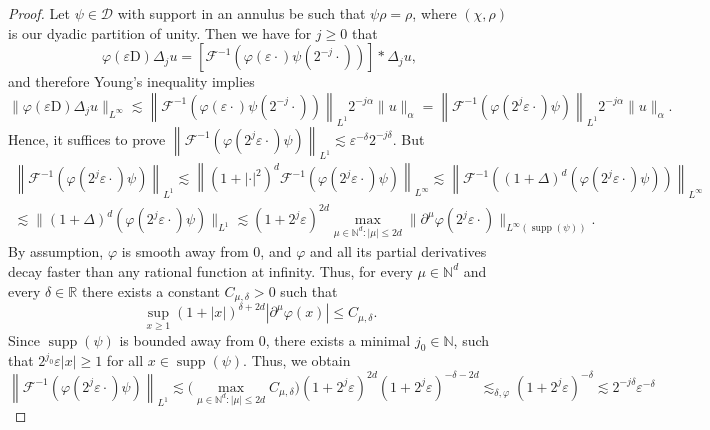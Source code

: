 \documentclass[11pt,a4paper]{article}
\newcommand{\cdummy}{\cdot}
\newcommand{\mathD}{\mathrm{D}}
\newcommand{\tmop}[1]{\ensuremath{\operatorname{#1}}}
\theoremstyle{remark}
\newcommand{\CD}{\ensuremath{\mathscr{D}}}
\newcommand{\CF}{\ensuremath{\mathscr{F}}}
\begin{document}
\begin{proof}
  Let $\psi \in \CD$ with support in an annulus be such that $\psi \rho = \rho$, where $( \chi , \rho )$ is our dyadic partition of unity. Then we have for $j \geqslant 0$ that
  \[
     \varphi ( \varepsilon \mathD ) \Delta_{j} u= \left[ \CF^{-1} ( \varphi (\varepsilon \cdummy ) \psi ( 2^{-j} \cdummy ) ) \right] \ast \Delta_{j}  u,
  \]
  and therefore Young's inequality implies
  \[
     \| \varphi ( \varepsilon \mathD ) \Delta_{j} u \|_{L^{\infty}} \lesssim \left\| \CF^{-1} ( \varphi ( \varepsilon \cdummy ) \psi ( 2^{-j} \cdummy ) ) \right\|_{L^{1}} 2^{-j \alpha} \| u \|_{\alpha} = \left\| \CF^{-1} ( \varphi ( 2^{j} \varepsilon \cdummy ) \psi ) \right\|_{L^{1}} 2^{-j \alpha} \| u \|_{\alpha}.
  \]
  Hence, it suffices to prove $\left\| \CF^{-1} ( \varphi ( 2^{j} \varepsilon \cdummy ) \psi ) \right\|_{L^{1}} \lesssim \varepsilon^{- \delta} 2^{-j \delta}$. But
  \begin{gather*}
     \left\| \CF^{-1} ( \varphi ( 2^{j} \varepsilon \cdummy ) \psi ) \right\|_{L^{1}} \lesssim \left\| ( 1+ | \cdot |^{2} )^{d} \CF^{-1} ( \varphi ( 2^{j} \varepsilon \cdummy ) \psi ) \right\|_{L^{\infty}}     \lesssim \left\| \CF^{-1} ( ( 1+ \Delta )^{d} ( \varphi ( 2^{j} \varepsilon \cdummy ) \psi ) ) \right\|_{L^{\infty}} \\
      \lesssim \| ( 1+ \Delta )^{d} ( \varphi ( 2^{j} \varepsilon \cdummy ) \psi ) \|_{L^{1}} \lesssim ( 1+2^{j} \varepsilon )^{2d} \max_{\mu \in \mathbb{N}^{d} : | \mu | \leqslant 2d} \| \partial^{\mu} \varphi ( 2^{j}  \varepsilon \cdot ) \|_{L^{\infty} ( \tmop{supp} ( \psi ) )} .
  \end{gather*}
  By assumption, $\varphi$ is smooth away from 0, and $\varphi$ and all its partial derivatives decay faster than any rational function at infinity. Thus, for every $\mu \in \mathbb{N}^{d}$ and every $\delta \in \mathbb{R}$ there exists a constant $C_{\mu , \delta} >0$ such that
  \[
     \sup_{x \geqslant 1} ( 1+ | x | )^{\delta +2d} | \partial^{\mu} \varphi ( x ) | \leqslant C_{\mu , \delta}.
  \]
  Since $\tmop{supp} ( \psi )$ is bounded away from $0$, there exists a minimal $j_{0} \in \mathbb{N}$, such that $2^{j_{0}} \varepsilon | x | \geqslant 1$ for all $x \in \tmop{supp} ( \psi )$. Thus, we obtain
  \[
     \left\| \CF^{-1} ( \varphi ( 2^{j} \varepsilon \cdummy ) \psi ) \right\|_{L^{1}} \lesssim \Big(\max_{\mu \in \mathbb{N}^{d} : | \mu | \leqslant 2d} C_{\mu, \delta}\Big) ( 1+2^{j} \varepsilon )^{2d} ( 1+2^{j}\varepsilon )^{- \delta -2d} \lesssim_{\delta , \varphi} ( 1+2^{j} \varepsilon )^{- \delta} \lesssim 2^{-j \delta} \varepsilon^{- \delta}
\]
\end{proof}
\end{document}
